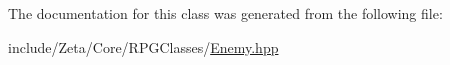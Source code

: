 The documentation for this class was generated from the following file\+:\begin{DoxyCompactItemize}
\item 
include/\+Zeta/\+Core/\+R\+P\+G\+Classes/\hyperlink{Enemy_8hpp}{Enemy.\+hpp}\end{DoxyCompactItemize}
